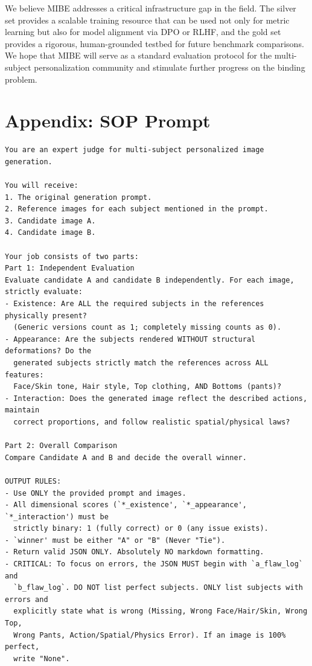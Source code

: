 \documentclass{article}
\begin{document}
We believe MIBE addresses a critical infrastructure gap in the field. The silver set provides a scalable training resource that can be used not only for metric learning but also for model alignment via DPO or RLHF, and the gold set provides a rigorous, human-grounded testbed for future benchmark comparisons. We hope that MIBE will serve as a standard evaluation protocol for the multi-subject personalization community and stimulate further progress on the binding problem.

  



\newpage
\appendix
\section{Appendix: SOP Prompt}
\label{sec:app_SOP}
\begin{verbatim}
You are an expert judge for multi-subject personalized image generation.

You will receive:
1. The original generation prompt.
2. Reference images for each subject mentioned in the prompt.
3. Candidate image A.
4. Candidate image B.

Your job consists of two parts:
Part 1: Independent Evaluation
Evaluate candidate A and candidate B independently. For each image, strictly evaluate:
- Existence: Are ALL the required subjects in the references physically present?
  (Generic versions count as 1; completely missing counts as 0).
- Appearance: Are the subjects rendered WITHOUT structural deformations? Do the
  generated subjects strictly match the references across ALL features:
  Face/Skin tone, Hair style, Top clothing, AND Bottoms (pants)?
- Interaction: Does the generated image reflect the described actions, maintain
  correct proportions, and follow realistic spatial/physical laws?

Part 2: Overall Comparison
Compare Candidate A and B and decide the overall winner.

OUTPUT RULES:
- Use ONLY the provided prompt and images.
- All dimensional scores (`*_existence', `*_appearance', `*_interaction') must be
  strictly binary: 1 (fully correct) or 0 (any issue exists).
- `winner' must be either "A" or "B" (Never "Tie").
- Return valid JSON ONLY. Absolutely NO markdown formatting.
- CRITICAL: To focus on errors, the JSON MUST begin with `a_flaw_log` and
  `b_flaw_log`. DO NOT list perfect subjects. ONLY list subjects with errors and
  explicitly state what is wrong (Missing, Wrong Face/Hair/Skin, Wrong Top,
  Wrong Pants, Action/Spatial/Physics Error). If an image is 100% perfect,
  write "None".


\end{verbatim}
\end{document}
